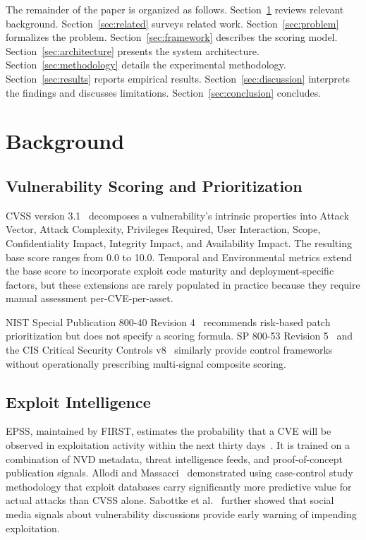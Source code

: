 \documentclass[journal]{IEEEtran}
\begin{document}
The remainder of the paper is organized as follows.
Section~\ref{sec:background} reviews relevant background.
Section~\ref{sec:related} surveys related work.
Section~\ref{sec:problem} formalizes the problem.
Section~\ref{sec:framework} describes the scoring model.
Section~\ref{sec:architecture} presents the system architecture.
Section~\ref{sec:methodology} details the experimental
methodology.
Section~\ref{sec:results} reports empirical results.
Section~\ref{sec:discussion} interprets the findings and
discusses limitations.
Section~\ref{sec:conclusion} concludes.

\section{Background}
\label{sec:background}

\subsection{Vulnerability Scoring and Prioritization}

CVSS version 3.1~\cite{first_cvss_v31} decomposes a
vulnerability's intrinsic properties into Attack Vector, Attack
Complexity, Privileges Required, User Interaction, Scope,
Confidentiality Impact, Integrity Impact, and Availability
Impact.  The resulting base score ranges from 0.0 to 10.0.
Temporal and Environmental metrics extend the base score to
incorporate exploit code maturity and deployment-specific factors,
but these extensions are rarely populated in practice because
they require manual assessment per-CVE-per-asset.

NIST Special Publication 800-40 Revision 4~\cite{nist80040r4}
recommends risk-based patch prioritization but does not specify a
scoring formula.  SP 800-53 Revision 5~\cite{nist80053r5} and the
CIS Critical Security Controls v8~\cite{cis_controls_v8} similarly
provide control frameworks without operationally prescribing
multi-signal composite scoring.

\subsection{Exploit Intelligence}

EPSS, maintained by FIRST, estimates the probability that a CVE
will be observed in exploitation activity within the next thirty
days~\cite{jacobs2021epss}.  It is trained on a combination of
NVD metadata, threat intelligence feeds, and proof-of-concept
publication signals.  Allodi and Massacci~\cite{allodi2014comparing}
demonstrated using case-control study methodology that exploit
databases carry significantly more predictive value for actual
attacks than CVSS alone.  Sabottke et al.~\cite{sabottke2015vulnerability}
further showed that social media signals about vulnerability
discussions provide early warning of impending exploitation.
\end{document}
